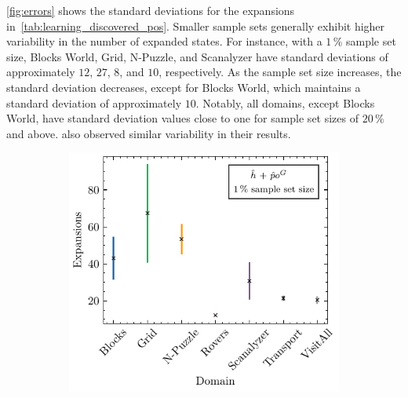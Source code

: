\documentclass[ppgc,diss,english]{iiufrgs}
\begin{document}
\cref{fig:errors} shows the standard deviations for the expansions in~\cref{tab:learning_discovered_pos}. Smaller sample sets generally exhibit higher variability in the number of expanded states. For instance, with a $1\,\%$ sample set size, Blocks World, Grid, N-Puzzle, and Scanalyzer have standard deviations of approximately $12$, $27$, $8$, and $10$, respectively. As the sample set size increases, the standard deviation decreases, except for Blocks World, which maintains a standard deviation of approximately $10$. Notably, all domains, except Blocks World, have standard deviation values close to one for sample set sizes of $20\,\%$ and above. \citet{Bettker.etal/2022} also observed similar variability in their results.

\begin{figure}[tb]
  \caption[Standard deviation of expansions using \hnn with \pog]{Mean number of expansions and its standard deviation per domain for GBFS guided by \hnn with \pog trained using sample sets of different sizes.}
  \centering
  \vspace{\baselineskip}
  \begin{subfigure}{0.41\textwidth}
    \centering
    \includegraphics[width=\linewidth]{img/error_hNN_poG_1pct.pdf}
  \end{subfigure}
  \begin{subfigure}{0.41\textwidth}
    \centering

\end{subfigure}
\end{figure}
\end{document}

